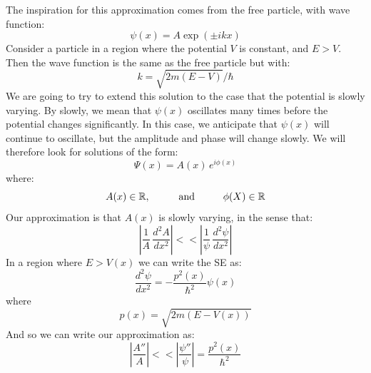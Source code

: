 \documentclass[12pt]{book}
\begin{document}
The inspiration for this approximation comes from the free particle, with wave function:
$$\psi(x) = A \exp(\pm ikx)$$
Consider a particle in a region where the potential $V$ is constant, and $E>V$.  Then the wave function is the same as the free particle but with:
$$k=\sqrt{2m(E-V)}/\hbar$$
We are going to try to extend this solution to the case that the potential is slowly varying.  By slowly, we mean that $\psi(x)$ oscillates many times before the potential changes significantly.  In this case, we anticipate that $\psi(x)$ will continue to oscillate, but the amplitude and phase will change slowly.  We will therefore look for solutions of the form:
\begin{equation}
\Psi(x) = A(x) \, e^{\displaystyle i \phi(x)}
\end{equation}
where:
$$A(x) \in \mathbb{R}, \hspace{1cm} {\rm and} \hspace{1cm} \phi(X) \in \mathbb{R}$$
Our approximation is that $A(x)$ is slowly varying, in the sense that:
$$\left| \frac{1}{A} \, \frac{d^2A}{dx^2}\right| << \left| \frac{1}{\psi}\,\frac{d^2 \psi}{dx^2} \right|$$
In a region where $E > V(x)$ we can write the SE as:
\begin{equation}
\label{eqn:wkbse}
\frac{d^2 \psi}{d x^2} = -\frac{p^2(x)}{\hbar^2} \psi(x)
\end{equation}
where
$$p(x) = \sqrt{2m(E-V(x))}$$
And so we can write our approximation as:
$$\left| \frac{A''}{A} \right| << \left| \frac{\psi''}{\psi} \right| = \frac{p^2(x)}{\hbar^2}$$
\end{document}
